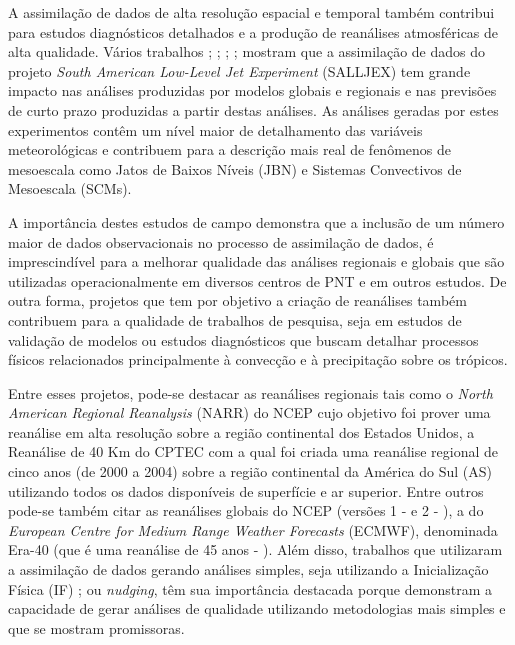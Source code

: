 A assimilação de dados de alta resolução espacial e temporal também contribui para estudos diagnósticos detalhados e a produção de reanálises atmosféricas de alta qualidade. Vários trabalhos \cite{cavalcantiherdies04}; \cite{herdiesetal06}; \cite{rozantecavalcanti07}; \cite{herdiesetal07}; \cite{skabarnicolini09} mostram que a assimilação de dados do projeto \textit{South American Low-Level Jet Experiment} (SALLJEX) tem grande impacto nas análises produzidas por modelos globais e regionais e nas previsões de curto prazo produzidas a partir destas análises. As análises geradas por estes experimentos contêm um nível maior de detalhamento das variáveis meteorológicas e contribuem para a descrição mais real de fenômenos de mesoescala como Jatos de Baixos Níveis (JBN) e Sistemas Convectivos de Mesoescala (SCMs). 

A importância destes estudos de campo demonstra que a inclusão de um número maior de dados observacionais no processo de assimilação de dados, é imprescindível para a melhorar qualidade das análises regionais e globais que são utilizadas operacionalmente em diversos centros de PNT e em outros estudos. De outra forma, projetos que tem por objetivo a criação de reanálises também contribuem para a qualidade de trabalhos de pesquisa, seja em estudos de validação de modelos ou estudos diagnósticos que buscam detalhar processos físicos relacionados principalmente à convecção e à precipitação sobre os trópicos. 

Entre esses projetos, pode-se destacar as reanálises regionais tais como o \textit{North American Regional Reanalysis} (NARR) do NCEP \cite{messingeretal06} cujo objetivo foi prover uma reanálise em alta resolução sobre a região continental dos Estados Unidos, a Reanálise de 40 Km do CPTEC \cite{aravequiaetal07} com a qual foi criada uma reanálise regional de cinco anos (de 2000 a 2004) sobre a região continental da América do Sul (AS) utilizando todos os dados disponíveis de superfície e ar superior. Entre outros pode-se também citar as reanálises globais do NCEP (versões 1 -  e 2 - ), a do \textit{European Centre for Medium Range Weather Forecasts} (ECMWF), denominada Era-40 (que é uma reanálise de 45 anos - ). Além disso, trabalhos que utilizaram a assimilação de dados gerando análises simples, seja utilizando a Inicialização Física (IF) \cite{nunescocke04}; \cite{biazettoetal05} ou \textit{nudging}, têm sua importância destacada porque demonstram a capacidade de gerar análises de qualidade utilizando metodologias mais simples e que se mostram promissoras. 

